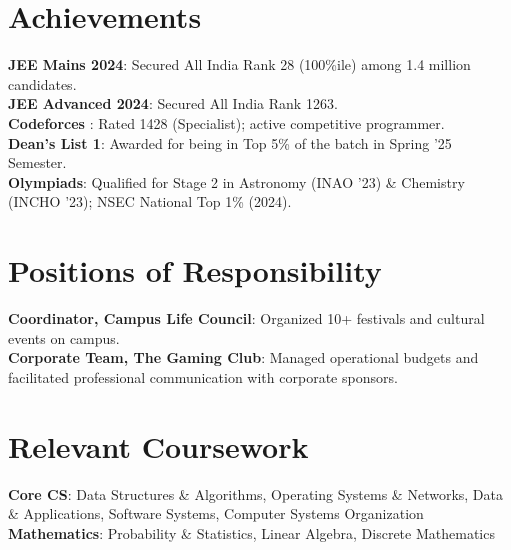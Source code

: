 \documentclass[letterpaper,11pt]{article}
\begin{document}
\vspace{-18pt}
\section{Achievements}
 \begin{itemize}[leftmargin=0.15in, label={}]
    \small{\item{
     \textbf{JEE Mains 2024}{: Secured All India Rank 28 (100\%ile) among 1.4 million candidates.} \\
     \textbf{JEE Advanced 2024}{: Secured All India Rank 1263.} \\
     \textbf{Codeforces} \href{https://codeforces.com/profile/meet27}{\faLink}{: Rated 1428 (Specialist); active competitive programmer.} \\
     \textbf{Dean’s List 1}{: Awarded for being in Top 5\% of the batch in Spring ’25 Semester.} \\
     \textbf{Olympiads}{: Qualified for Stage 2 in Astronomy (INAO ’23) \& Chemistry (INCHO ’23); NSEC National Top 1\% (2024).}
    }}
 \end{itemize}


\vspace{-15pt}
\section{Positions of Responsibility}
 \begin{itemize}[leftmargin=0.15in, label={}]
    \small{\item{
     \textbf{Coordinator, Campus Life Council}{: Organized 10+ festivals and cultural events on campus.} \\
     \textbf{Corporate Team, The Gaming Club}{: Managed operational budgets and facilitated professional communication with corporate sponsors.}
    }}
 \end{itemize}


\vspace{-15pt}
\section{Relevant Coursework}
 \begin{itemize}[leftmargin=0.15in, label={}]
    \small{\item{
     \textbf{Core CS}{: Data Structures \& Algorithms, Operating Systems \& Networks, Data \& Applications, Software Systems, Computer Systems Organization} \\
     \textbf{Mathematics}{: Probability \& Statistics, Linear Algebra, Discrete Mathematics}
    }}
 \end{itemize}

\end{document}
